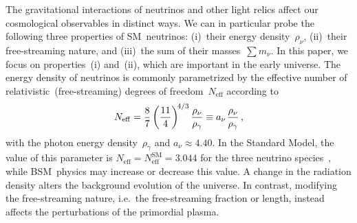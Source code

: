 \documentclass[11pt]{article}
\numberwithin{equation}{section}
\newcommand{\Neff}{N_\mathrm{eff}}
\begin{document}
The gravitational interactions of neutrinos and other light relics affect our cosmological observables in distinct ways. We can in particular probe the following three properties of SM~neutrinos: (i)~their energy density~$\rho_\nu$, (ii)~their free-streaming nature, and (iii)~the sum of their masses~$\sum m_\nu$. In this paper, we focus on properties~(i) and~(ii), which are important in the early universe. The energy density of neutrinos is commonly parametrized by the effective number of relativistic~(free-streaming) degrees of freedom~$\Neff$ according to
\begin{equation}
	\Neff = \frac{8}{7} \left(\frac{11}{4}\right)^{\!4/3} \frac{\rho_\nu}{\rho_\gamma} \equiv a_\nu\hskip1pt\frac{\rho_\nu}{\rho_\gamma}\, ,	\label{eq:Neff}
\end{equation}
with the photon energy density~$\rho_\gamma$ and $a_\nu \approx 4.40$. In the Standard Model, the value of this parameter is $\Neff = \Neff^\mathrm{SM} = 3.044$ for the three neutrino species~\cite{Akita:2020szl, Froustey:2020mcq, Bennett:2020zkv, Cielo:2023bqp, Drewes:2024wbw, Drewes:2024nbg}, while BSM~physics may increase or decrease this value. A change in the radiation density alters the background evolution of the universe. In contrast, modifying the free-streaming nature, i.e.\ the free-streaming fraction or length, instead affects the perturbations of the primordial plasma.
\end{document}
